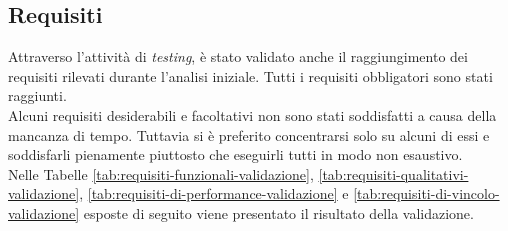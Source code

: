 \subsection{Requisiti}
\label{sec:validazione-requisiti}
\noindent Attraverso l’attività di \textit{testing}, è stato validato anche il raggiungimento dei requisiti rilevati
durante l'analisi iniziale.
Tutti i requisiti obbligatori sono stati raggiunti.\\
Alcuni requisiti desiderabili e facoltativi non sono stati soddisfatti a causa della mancanza di tempo.
Tuttavia si è preferito concentrarsi solo su alcuni di essi e soddisfarli pienamente
piuttosto che eseguirli tutti in modo non esaustivo.\\
Nelle Tabelle \ref{tab:requisiti-funzionali-validazione}, \ref{tab:requisiti-qualitativi-validazione}, \ref{tab:requisiti-di-performance-validazione} e \ref{tab:requisiti-di-vincolo-validazione} esposte di seguito viene presentato il risultato della validazione.

